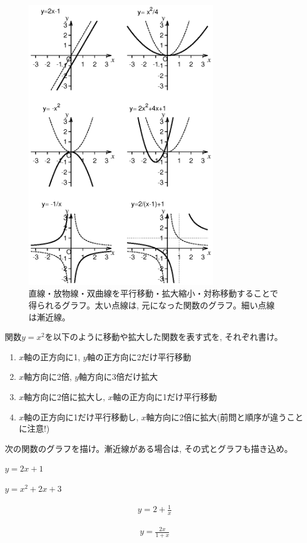 \begin{figure}[h]
    \centering
    \includegraphics[width=8.2cm]{basic_graph.eps}
    \caption{直線・放物線・双曲線を平行移動・拡大縮小・対称移動することで得られるグラフ。太い点線は, 元になった関数のグラフ。細い点線は漸近線。}\label{fig:basic_graph}
\end{figure}

\begin{q}\label{q:func_trans2} 関数$y=x^2$を以下のように移動や拡大した関数を表す式を, それぞれ書け。
\begin{enumerate}
\item $x$軸の正方向に1, $y$軸の正方向に2だけ平行移動
\item $x$軸方向に2倍, $y$軸方向に3倍だけ拡大
\item $x$軸方向に2倍に拡大し, $x$軸の正方向に1だけ平行移動
\item $x$軸の正方向に1だけ平行移動し, $x$軸方向に2倍に拡大(前問と順序が違うことに注意!)
\end{enumerate}\end{q}
\mv

\begin{q}\label{q:func_trans3} 次の関数のグラフを描け。漸近線がある場合は, その式とグラフも描き込め。
\begin{edaenumerate}
\item $y=2x+1$
\item $y=x^2+2x+3$ 
\item \begin{eqnarray*}y=2+\frac{1}{x}\end{eqnarray*}
\item \begin{eqnarray*}y=\frac{2x}{1+x}\end{eqnarray*}
\end{edaenumerate}\end{q}
\hv



